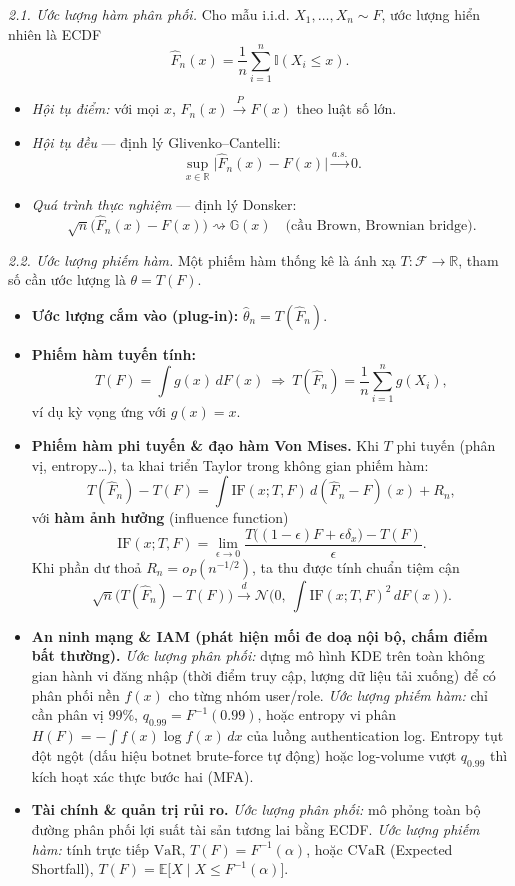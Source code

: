 
\textit{2.1. Ước lượng hàm phân phối.} Cho mẫu i.i.d. $X_1,\dots,X_n\sim F$, ước lượng hiển nhiên là ECDF
\[ \widehat F_n(x)=\frac1n\sum_{i=1}^n \mathbb{I}(X_i\le x). \]
\begin{itemize}
\item \emph{Hội tụ điểm:} với mọi $x$, $\widehat F_n(x)\xrightarrow{P}F(x)$ theo luật số lớn.
\item \emph{Hội tụ đều} --- định lý Glivenko--Cantelli:
  \[ \sup_{x\in\mathbb{R}}\big|\widehat F_n(x)-F(x)\big|\xrightarrow{a.s.}0. \]
\item \emph{Quá trình thực nghiệm} --- định lý Donsker:
  \[ \sqrt{n}\big(\widehat F_n(x)-F(x)\big)\rightsquigarrow \mathbb{G}(x)\quad\text{(cầu Brown, Brownian bridge).} \]
\end{itemize}

\textit{2.2. Ước lượng phiếm hàm.} Một phiếm hàm thống kê là ánh xạ $T:\mathcal{F}\to\mathbb{R}$, tham số cần ước lượng là $\theta=T(F)$.
\begin{itemize}
\item \textbf{Ước lượng cắm vào (plug-in):} $\widehat\theta_n=T(\widehat F_n)$.
\item \textbf{Phiếm hàm tuyến tính:}
  \[ T(F)=\int g(x)\,dF(x)\ \Longrightarrow\ T(\widehat F_n)=\frac1n\sum_{i=1}^n g(X_i), \]
  ví dụ kỳ vọng ứng với $g(x)=x$.
\item \textbf{Phiếm hàm phi tuyến \& đạo hàm Von Mises.} Khi $T$ phi tuyến (phân vị, entropy\dots), ta khai triển Taylor trong không gian phiếm hàm:
  \[ T(\widehat F_n)-T(F)=\int \mathrm{IF}(x;T,F)\,d(\widehat F_n-F)(x)+R_n, \]
  với \textbf{hàm ảnh hưởng} (influence function)
  \[ \mathrm{IF}(x;T,F)=\lim_{\epsilon\to 0}\frac{T\big((1-\epsilon)F+\epsilon\delta_x\big)-T(F)}{\epsilon}. \]
  Khi phần dư thoả $R_n=o_P(n^{-1/2})$, ta thu được tính chuẩn tiệm cận
  \[ \sqrt{n}\big(T(\widehat F_n)-T(F)\big)\xrightarrow{d}\mathcal{N}\Big(0,\ \int \mathrm{IF}(x;T,F)^2\,dF(x)\Big). \]
\end{itemize}

\begin{itemize}
\item \textbf{An ninh mạng \& IAM (phát hiện mối đe doạ nội bộ, chấm điểm bất thường).}
  \emph{Ước lượng phân phối:} dựng mô hình KDE trên toàn không gian hành vi đăng nhập (thời điểm truy cập, lượng dữ liệu tải xuống) để có phân phối nền $f(x)$ cho từng nhóm user/role.
  \emph{Ước lượng phiếm hàm:} chỉ cần phân vị $99\%$, $q_{0.99}=F^{-1}(0.99)$, hoặc entropy vi phân $H(F)=-\int f(x)\log f(x)\,dx$ của luồng authentication log. Entropy tụt đột ngột (dấu hiệu botnet brute-force tự động) hoặc log-volume vượt $q_{0.99}$ thì kích hoạt xác thực bước hai (MFA).
\item \textbf{Tài chính \& quản trị rủi ro.}
  \emph{Ước lượng phân phối:} mô phỏng toàn bộ đường phân phối lợi suất tài sản tương lai bằng ECDF.
  \emph{Ước lượng phiếm hàm:} tính trực tiếp $\mathrm{VaR}$, $T(F)=F^{-1}(\alpha)$, hoặc $\mathrm{CVaR}$ (Expected Shortfall), $T(F)=\mathbb{E}\big[X\mid X\le F^{-1}(\alpha)\big]$.
\end{itemize}

